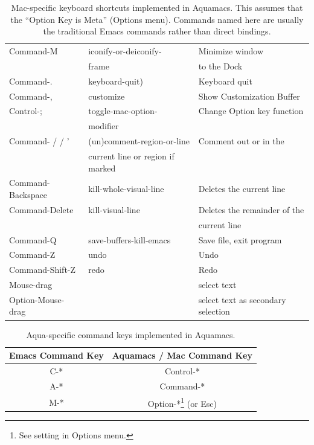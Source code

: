 \documentclass[11pt,letterpaper]{article}
\begin{document}
\begin{table}[thp]
\begin{center}
\begin{tabular}{|l|l|l|}
\hline Command-M & iconify-or-deiconify- & Minimize window \\ & frame &  to the Dock\\

\hline Command-. & keyboard-quit) & Keyboard quit\\

\hline Command-, & customize & Show Customization Buffer\\

\hline Control-; & toggle-mac-option- & Change Option key function\\ & modifier &\\

\hline Command-{ / } / '& (un)comment-region-or-line & Comment out or in the \\ & current line or region if 
marked  &\\

\hline Command-Backspace & kill-whole-visual-line & Deletes the current line \\
\hline Command-Delete & kill-visual-line & Deletes the remainder of the
\\ & & current line \\

\hline Command-Q & save-buffers-kill-emacs & Save file, exit program\\

\hline Command-Z & undo & Undo\\

\hline Command-Shift-Z &  redo & Redo\\

\hline Mouse-drag & & select text \\
\hline Option-Mouse-drag & & select text as secondary selection \\

\hline 
\end{tabular} 
\caption{Mac-specific keyboard shortcuts implemented in
  Aquamacs. This assumes that the ``Option Key is Meta'' (Options menu).  Commands named here are usually the traditional Emacs commands rather than direct bindings.}
\label{tab:shortcuts}
\end{center}
\end{table}


\begin{table}[htp]
\begin{center}
 \begin{tabular}{|c|c|}
\hline \textbf{Emacs Command Key} & \textbf{Aquamacs / Mac Command Key}\\
\hline C-* & Control-*\\
\hline A-* & Command-*\\
\hline M-* & Option-*\footnote{See setting in Options menu.}
(or Esc)\\
\hline 
\end{tabular} 
\caption{Aqua-specific command keys implemented in Aquamacs.}
\label{tab:command}
\end{center}
\end{table}
\end{document}
